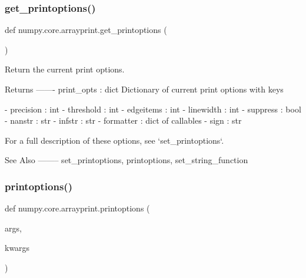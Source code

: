 \subsubsection{\texorpdfstring{get\+\_\+printoptions()}{get\_printoptions()}}
{\footnotesize\ttfamily def numpy.\+core.\+arrayprint.\+get\+\_\+printoptions (\begin{DoxyParamCaption}{ }\end{DoxyParamCaption})}

\begin{DoxyVerb}Return the current print options.

Returns
-------
print_opts : dict
    Dictionary of current print options with keys

      - precision : int
      - threshold : int
      - edgeitems : int
      - linewidth : int
      - suppress : bool
      - nanstr : str
      - infstr : str
      - formatter : dict of callables
      - sign : str

    For a full description of these options, see `set_printoptions`.

See Also
--------
set_printoptions, printoptions, set_string_function\end{DoxyVerb}
 \mbox{\label{namespacenumpy_1_1core_1_1arrayprint_a72c3329c103e1188af0d0a3927274321}} 
\subsubsection{\texorpdfstring{printoptions()}{printoptions()}}
{\footnotesize\ttfamily def numpy.\+core.\+arrayprint.\+printoptions (\begin{DoxyParamCaption}\item[{}]{args,  }\item[{}]{kwargs }\end{DoxyParamCaption})}

